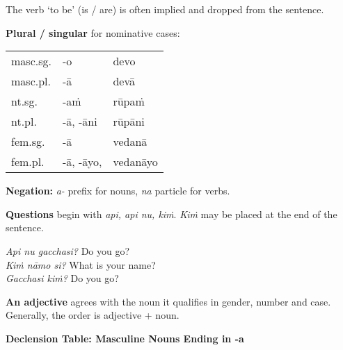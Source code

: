 \documentclass[11pt,oneside]{memoir}
\begin{document}
The verb `to be' (is / are) is often implied and dropped from the sentence.

\bigskip

\begin{multicols}{2}

\textbf{Plural / singular} for nominative cases:

\begin{center}
\begin{tabular}{lll}
masc.sg. & -o & devo\\[0pt]
masc.pl. & -ā & devā\\[0pt]
\hline
nt.sg. & -aṁ & rūpaṁ\\[0pt]
nt.pl. & -ā, -āni & rūpāni\\[0pt]
\hline
fem.sg. & -ā & vedanā\\[0pt]
fem.pl. & -ā, -āyo, & vedanāyo\\[0pt]
\end{tabular}
\end{center}

\vfill\null

\columnbreak

\textbf{Negation:} \emph{a-} prefix for nouns, \emph{na} particle for verbs.

\textbf{Questions} begin with \emph{api, api nu, kiṁ}. \emph{Kiṁ} may be placed at the end of the sentence.

\emph{Api nu gacchasi?} Do you go?\\[0pt]
\emph{Kiṁ nāmo si?} What is your name?\\[0pt]
\emph{Gacchasi kiṁ?} Do you go?

\textbf{An adjective} agrees with the noun it qualifies in gender, number and case. Generally, the order is adjective + noun.

\end{multicols}

\textbf{Declension Table: Masculine Nouns Ending in -a}
\end{document}

